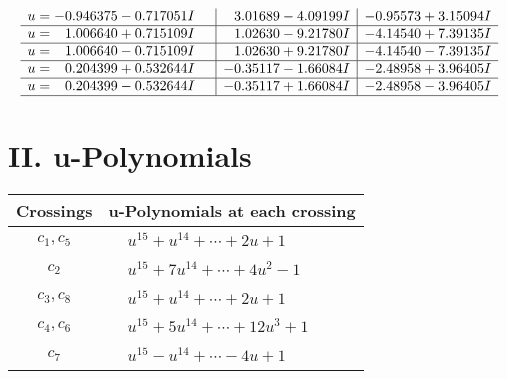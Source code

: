 \documentclass[1p]{elsarticle_modified}
\theoremstyle{definition}
\begin{document}
$$\begin{array}{c|c|c}
\begin{aligned}
u &= -0.946375 - 0.717051 I\end{aligned}
 & \phantom{-}3.01689 - 4.09199 I & -0.95573 + 3.15094 I \\ \hline\begin{aligned}
u &= \phantom{-}1.006640 + 0.715109 I\end{aligned}
 & \phantom{-}1.02630 - 9.21780 I & -4.14540 + 7.39135 I \\ \hline\begin{aligned}
u &= \phantom{-}1.006640 - 0.715109 I\end{aligned}
 & \phantom{-}1.02630 + 9.21780 I & -4.14540 - 7.39135 I \\ \hline\begin{aligned}
u &= \phantom{-}0.204399 + 0.532644 I\end{aligned}
 & -0.35117 - 1.66084 I & -2.48958 + 3.96405 I \\ \hline\begin{aligned}
u &= \phantom{-}0.204399 - 0.532644 I\end{aligned}
 & -0.35117 + 1.66084 I & -2.48958 - 3.96405 I\\
 \hline 
 \end{array}$$\newpage
\newpage\renewcommand{\arraystretch}{1}
\centering \section*{ II. u-Polynomials}
\begin{tabular}{m{50pt}|m{274pt}}
Crossings & \hspace{64pt}u-Polynomials at each crossing \\
\hline $$\begin{aligned}c_{1},c_{5}\end{aligned}$$&$\begin{aligned}
&u^{15}+u^{14}+\cdots+2 u+1
\end{aligned}$\\
\hline $$\begin{aligned}c_{2}\end{aligned}$$&$\begin{aligned}
&u^{15}+7 u^{14}+\cdots+4 u^2-1
\end{aligned}$\\
\hline $$\begin{aligned}c_{3},c_{8}\end{aligned}$$&$\begin{aligned}
&u^{15}+u^{14}+\cdots+2 u+1
\end{aligned}$\\
\hline $$\begin{aligned}c_{4},c_{6}\end{aligned}$$&$\begin{aligned}
&u^{15}+5 u^{14}+\cdots+12 u^3+1
\end{aligned}$\\
\hline $$\begin{aligned}c_{7}\end{aligned}$$&$\begin{aligned}
&u^{15}- u^{14}+\cdots-4 u+1
\end{aligned}$\\
\hline
\end{tabular}\newpage\renewcommand{\arraystretch}{1}
\end{document}
